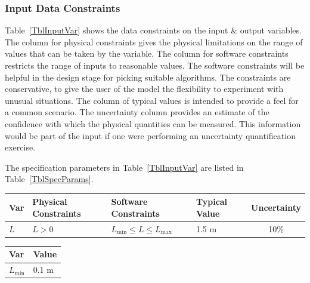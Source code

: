 \documentclass[12pt]{article}
\begin{document}
\subsubsection{Input Data Constraints}
\label{sec_DataConstraints}

Table~\ref{TblInputVar} shows the data constraints on the input \& output
variables.  The column for physical constraints gives the physical limitations
on the range of values that can be taken by the variable.  The column for
software constraints restricts the range of inputs to reasonable values.  The
software constraints will be helpful in the design stage for picking suitable
algorithms.  The constraints are conservative, to give the user of the model the
flexibility to experiment with unusual situations.  The column of typical values
is intended to provide a feel for a common scenario.  The uncertainty column
provides an estimate of the confidence with which the physical quantities can be
measured.  This information would be part of the input if one were performing an
uncertainty quantification exercise.

The specification parameters in Table~\ref{TblInputVar} are listed in
Table~\ref{TblSpecParams}.

\begin{table}[!h]
    \caption{Input Variables} \label{TblInputVar}
    \renewcommand{\arraystretch}{1.2}
    \noindent \begin{longtable*}{l l l l c}
        \toprule
        \textbf{Var} & \textbf{Physical Constraints} & \textbf{Software Constraints} &
        \textbf{Typical Value} & \textbf{Uncertainty}\\
        \midrule
        $L$ & $L > 0$ & $L_{\text{min}} \leq L \leq L_{\text{max}}$ & 1.5 \si[per-mode=symbol] {\metre} & 10\%
        \\
        \bottomrule
    \end{longtable*}
\end{table}

\begin{table}[!h]
    \caption{Specification Parameter Values} \label{TblSpecParams}
    \renewcommand{\arraystretch}{1.2}
    \noindent \begin{longtable*}{l l}
        \toprule
        \textbf{Var} & \textbf{Value} \\
        \midrule
        $L_\text{min}$ & 0.1 \si{\metre}\\
        \bottomrule
    \end{longtable*}
\end{table}
\end{document}
